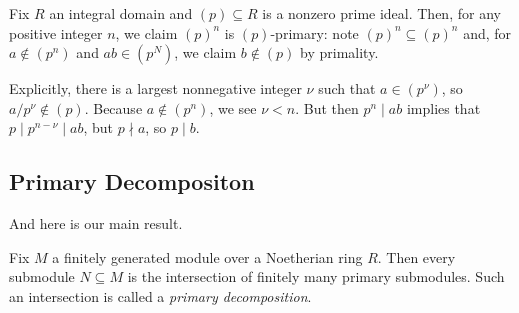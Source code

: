 \begin{example} \label{ex:primepowerprimary}
	Fix $R$ an integral domain and $(p)\subseteq R$ is a nonzero prime ideal. Then, for any positive integer $n$, we claim $(p)^n$ is $(p)$-primary: note $(p)^n\subseteq(p)^n$ and, for $a\notin(p^n)$ and $ab\in(p^N)$, we claim $b\notin(p)$ by primality.
	
	Explicitly, there is a largest nonnegative integer $\nu$ such that $a\in\left(p^\nu\right)$, so $a/p^\nu\notin(p)$. Because $a\notin\left(p^n\right)$, we see $\nu<n$. But then $p^n\mid ab$ implies that $p\mid p^{n-\nu}\mid ab$, but $p\nmid a$, so $p\mid b$.
\end{example}

\subsection{Primary Decompositon}
And here is our main result.
\begin{theorem} \label{thm:primdecompi}
	Fix $M$ a finitely generated module over a Noetherian ring $R$. Then every submodule $N\subseteq M$ is the intersection of finitely many primary submodules. Such an intersection is called a \textit{primary decomposition}.
\end{theorem}
